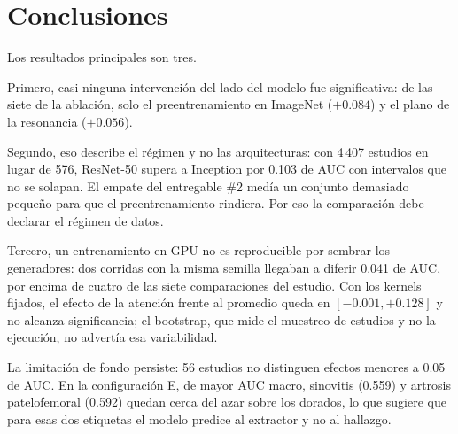 \documentclass{article}
\begin{document}
\section{Conclusiones}

Los resultados principales son tres.

Primero, casi ninguna intervención del lado del modelo fue
significativa: de las siete de la ablación, solo el preentrenamiento en ImageNet
($+0.084$) y el plano de la resonancia ($+0.056$).

Segundo, eso describe el régimen y no las arquitecturas: con 4\,407
estudios en lugar de 576, ResNet-50 supera a Inception por 0.103 de AUC con
intervalos que no se solapan. El empate del entregable \#2 medía un conjunto
demasiado pequeño para que el preentrenamiento rindiera. Por eso la comparación debe
declarar el régimen de datos.

Tercero, un entrenamiento en GPU no es reproducible por sembrar los
generadores: dos corridas con la misma semilla llegaban a diferir 0.041 de AUC,
por encima de cuatro de las siete comparaciones del estudio. Con los kernels
fijados, el efecto de la atención frente al promedio queda en $[-0.001, +0.128]$
y no alcanza significancia; el bootstrap, que mide el muestreo de estudios y no la
ejecución, no advertía esa variabilidad.

La limitación de fondo persiste: 56 estudios no distinguen efectos menores a
0.05 de AUC. En la configuración E, de mayor AUC macro, sinovitis (0.559) y
artrosis patelofemoral (0.592) quedan cerca del azar sobre los dorados, lo que
sugiere que para esas dos etiquetas el modelo predice al extractor y no al
hallazgo.



\end{document}
